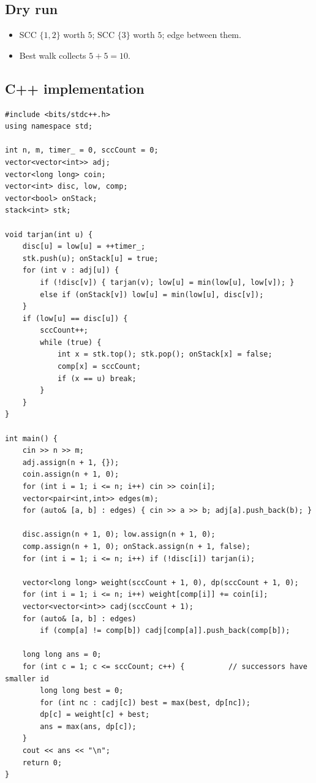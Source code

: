 \subsection*{Dry run}


\begin{itemize}
  \item SCC $\{1,2\}$ worth $5$; SCC $\{3\}$ worth $5$; edge between them.
  \item Best walk collects $5+5=10$.
\end{itemize}

\subsection*{C++ implementation}

\begin{lstlisting}
#include <bits/stdc++.h>
using namespace std;

int n, m, timer_ = 0, sccCount = 0;
vector<vector<int>> adj;
vector<long long> coin;
vector<int> disc, low, comp;
vector<bool> onStack;
stack<int> stk;

void tarjan(int u) {
    disc[u] = low[u] = ++timer_;
    stk.push(u); onStack[u] = true;
    for (int v : adj[u]) {
        if (!disc[v]) { tarjan(v); low[u] = min(low[u], low[v]); }
        else if (onStack[v]) low[u] = min(low[u], disc[v]);
    }
    if (low[u] == disc[u]) {
        sccCount++;
        while (true) {
            int x = stk.top(); stk.pop(); onStack[x] = false;
            comp[x] = sccCount;
            if (x == u) break;
        }
    }
}

int main() {
    cin >> n >> m;
    adj.assign(n + 1, {});
    coin.assign(n + 1, 0);
    for (int i = 1; i <= n; i++) cin >> coin[i];
    vector<pair<int,int>> edges(m);
    for (auto& [a, b] : edges) { cin >> a >> b; adj[a].push_back(b); }

    disc.assign(n + 1, 0); low.assign(n + 1, 0);
    comp.assign(n + 1, 0); onStack.assign(n + 1, false);
    for (int i = 1; i <= n; i++) if (!disc[i]) tarjan(i);

    vector<long long> weight(sccCount + 1, 0), dp(sccCount + 1, 0);
    for (int i = 1; i <= n; i++) weight[comp[i]] += coin[i];
    vector<vector<int>> cadj(sccCount + 1);
    for (auto& [a, b] : edges)
        if (comp[a] != comp[b]) cadj[comp[a]].push_back(comp[b]);

    long long ans = 0;
    for (int c = 1; c <= sccCount; c++) {          // successors have smaller id
        long long best = 0;
        for (int nc : cadj[c]) best = max(best, dp[nc]);
        dp[c] = weight[c] + best;
        ans = max(ans, dp[c]);
    }
    cout << ans << "\n";
    return 0;
}
\end{lstlisting}

